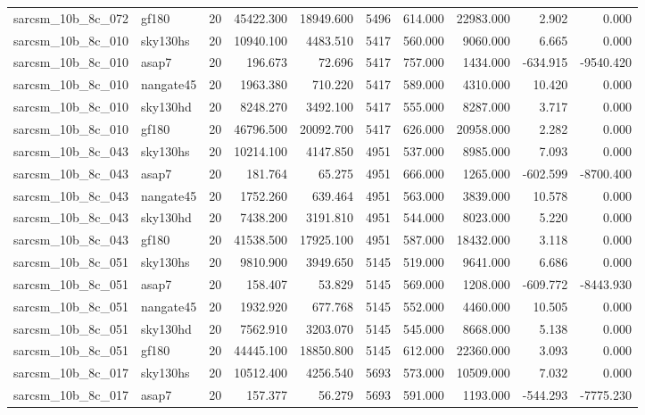 \begin{longtable}{llrrrrrrrr}
sarcsm\_10b\_8c\_072 & gf180 & 20 & 45422.300 & 18949.600 & 5496 & 614.000 & 22983.000 & 2.902 & 0.000 \\
sarcsm\_10b\_8c\_010 & sky130hs & 20 & 10940.100 & 4483.510 & 5417 & 560.000 & 9060.000 & 6.665 & 0.000 \\
sarcsm\_10b\_8c\_010 & asap7 & 20 & 196.673 & 72.696 & 5417 & 757.000 & 1434.000 & -634.915 & -9540.420 \\
sarcsm\_10b\_8c\_010 & nangate45 & 20 & 1963.380 & 710.220 & 5417 & 589.000 & 4310.000 & 10.420 & 0.000 \\
sarcsm\_10b\_8c\_010 & sky130hd & 20 & 8248.270 & 3492.100 & 5417 & 555.000 & 8287.000 & 3.717 & 0.000 \\
sarcsm\_10b\_8c\_010 & gf180 & 20 & 46796.500 & 20092.700 & 5417 & 626.000 & 20958.000 & 2.282 & 0.000 \\
sarcsm\_10b\_8c\_043 & sky130hs & 20 & 10214.100 & 4147.850 & 4951 & 537.000 & 8985.000 & 7.093 & 0.000 \\
sarcsm\_10b\_8c\_043 & asap7 & 20 & 181.764 & 65.275 & 4951 & 666.000 & 1265.000 & -602.599 & -8700.400 \\
sarcsm\_10b\_8c\_043 & nangate45 & 20 & 1752.260 & 639.464 & 4951 & 563.000 & 3839.000 & 10.578 & 0.000 \\
sarcsm\_10b\_8c\_043 & sky130hd & 20 & 7438.200 & 3191.810 & 4951 & 544.000 & 8023.000 & 5.220 & 0.000 \\
sarcsm\_10b\_8c\_043 & gf180 & 20 & 41538.500 & 17925.100 & 4951 & 587.000 & 18432.000 & 3.118 & 0.000 \\
sarcsm\_10b\_8c\_051 & sky130hs & 20 & 9810.900 & 3949.650 & 5145 & 519.000 & 9641.000 & 6.686 & 0.000 \\
sarcsm\_10b\_8c\_051 & asap7 & 20 & 158.407 & 53.829 & 5145 & 569.000 & 1208.000 & -609.772 & -8443.930 \\
sarcsm\_10b\_8c\_051 & nangate45 & 20 & 1932.920 & 677.768 & 5145 & 552.000 & 4460.000 & 10.505 & 0.000 \\
sarcsm\_10b\_8c\_051 & sky130hd & 20 & 7562.910 & 3203.070 & 5145 & 545.000 & 8668.000 & 5.138 & 0.000 \\
sarcsm\_10b\_8c\_051 & gf180 & 20 & 44445.100 & 18850.800 & 5145 & 612.000 & 22360.000 & 3.093 & 0.000 \\
sarcsm\_10b\_8c\_017 & sky130hs & 20 & 10512.400 & 4256.540 & 5693 & 573.000 & 10509.000 & 7.032 & 0.000 \\
sarcsm\_10b\_8c\_017 & asap7 & 20 & 157.377 & 56.279 & 5693 & 591.000 & 1193.000 & -544.293 & -7775.230 \\

\end{longtable}
